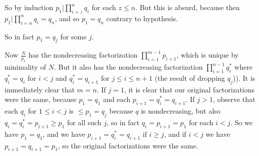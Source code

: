 \documentclass[12pt]{article}
\begin{document}
So by induction $p_1 | \prod_{i=z}^nq_i$ for each $z\leq n$.  But this is absurd, because then $p_1 | \prod_{i=n}^nq_i=q_n$, and so $p_1=q_n$ contrary to hypothesis.

So in fact $p_1=q_j$ for some $j$.

Now $\frac N{p_1}$ has the nondecreasing factorization $\prod_{i=1}^{m-1}p_{i+1}$, which is unique by minimality of $N$.  But it also has the nondecreasing factorization
$\prod_{i=1}^{n-1}q^*_i$ where $q^*_i = q_i$ for $i<j$ and $q^*_i = q_{i+1}$ for $j \leq i \leq n+1$ (the result of dropping $q_j$)).  It is immediately clear that $m=n$.  If $j=1$, it is clear that our original factorizations were the same, because $p_1=q_1$ and each $p_{i+1}=q^*_i=q_{i+1}$.  If $j>1$, observe that each $q_i$ for $1\leq  i < j$ is $\leq p_1=q_j$ because $q$ is nondecreasing, but also $q_i = q^*_i = p_{i+1} \geq p_1$ for all such $j$, so in fact $q_i = p_{i+1}=p_1$ for each $i<j$.  So we have $p_1 = q_1$, and we have
$p_{i+1}= q^*_i = q_{i+1}$ if $i \geq j$, and if $i<j$ we have $p_{i+1}=q_{i+1}=p_1$, so the original factorizations were the same.
\end{document}
